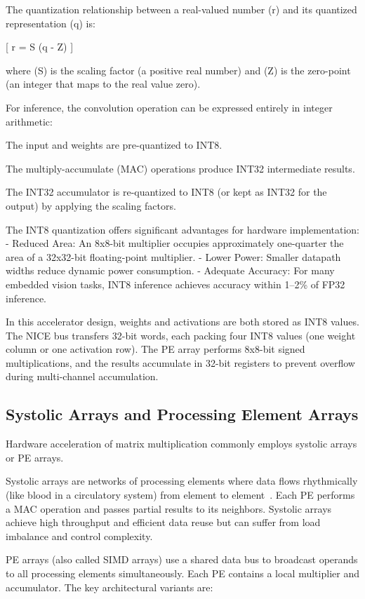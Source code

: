 The quantization relationship between a real-valued number (r) and its quantized representation (q) is:


[ r = S (q - Z) ]


where (S) is the scaling factor (a positive real number) and (Z) is the zero-point (an integer that maps to the real value zero).


For inference, the convolution operation can be expressed entirely in integer arithmetic:


The input and weights are pre-quantized to INT8.


The multiply-accumulate (MAC) operations produce INT32 intermediate results.


The INT32 accumulator is re-quantized to INT8 (or kept as INT32 for the output) by applying the scaling factors.


The INT8 quantization offers significant advantages for hardware implementation: - Reduced Area: An 8x8-bit multiplier occupies approximately one-quarter the area of a 32x32-bit floating-point multiplier. - Lower Power: Smaller datapath widths reduce dynamic power consumption. - Adequate Accuracy: For many embedded vision tasks, INT8 inference achieves accuracy within 1–2\% of FP32 inference.


In this accelerator design, weights and activations are both stored as INT8 values. The NICE bus transfers 32-bit words, each packing four INT8 values (one weight column or one activation row). The PE array performs 8x8-bit signed multiplications, and the results accumulate in 32-bit registers to prevent overflow during multi-channel accumulation.


\subsection{Systolic Arrays and Processing Element Arrays}

Hardware acceleration of matrix multiplication commonly employs systolic arrays or PE arrays.


Systolic arrays are networks of processing elements where data flows rhythmically (like blood in a circulatory system) from element to element~\cite{KUNG_SYSTOLIC}. Each PE performs a MAC operation and passes partial results to its neighbors. Systolic arrays achieve high throughput and efficient data reuse but can suffer from load imbalance and control complexity.


PE arrays (also called SIMD arrays) use a shared data bus to broadcast operands to all processing elements simultaneously. Each PE contains a local multiplier and accumulator. The key architectural variants are:


